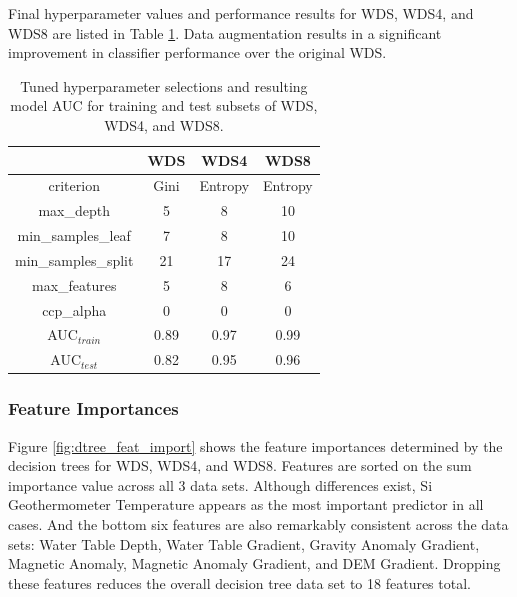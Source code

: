 Final hyperparameter values and performance results for WDS, WDS4, and WDS8 are listed in Table \ref{tab:dtree_tuning}. Data augmentation results in a significant improvement in classifier performance over the original WDS.

\begin{table}[!htp]
\centering
\begin{tabular}{c|c|c|c|}
\cline{2-4}
                                          & WDS & WDS4 & WDS8 \\ \hline
\multicolumn{1}{|c|}{criterion}           & Gini & Entropy & Entropy \\ \hline
\multicolumn{1}{|c|}{max\_depth}          & 5 & 8 & 10 \\ \hline
\multicolumn{1}{|c|}{min\_samples\_leaf}  & 7 & 8 & 10 \\ \hline
\multicolumn{1}{|c|}{min\_samples\_split} & 21 & 17 & 24 \\ \hline
\multicolumn{1}{|c|}{max\_features}       & 5 & 8 & 6 \\ \hline
\multicolumn{1}{|c|}{ccp\_alpha}          & 0  & 0 & 0 \\ \hline
\multicolumn{1}{|c|}{AUC$_{train}$}       & 0.89 & 0.97 & 0.99 \\ \hline
\multicolumn{1}{|c|}{AUC$_{test}$} & 0.82 & 0.95 & 0.96 \\ \hline
\end{tabular}
\caption[Decision tree hyperparameter values]{Tuned hyperparameter selections and resulting model AUC for training and test subsets of WDS, WDS4, and WDS8.}
\label{tab:dtree_tuning}
\end{table}

\subsubsection{Feature Importances} \label{ch5:dtree_feat_importance}

Figure \ref{fig:dtree_feat_import} shows the feature importances determined by the decision trees for WDS, WDS4, and WDS8.  Features are sorted on the sum importance value across all 3 data sets. Although differences exist, Si Geothermometer Temperature appears as the most important predictor in all cases. And the bottom six features are also remarkably consistent across the data sets: Water Table Depth, Water Table Gradient, Gravity Anomaly Gradient, Magnetic Anomaly, Magnetic Anomaly Gradient, and DEM Gradient. Dropping these features reduces the overall decision tree data set to 18 features total.

